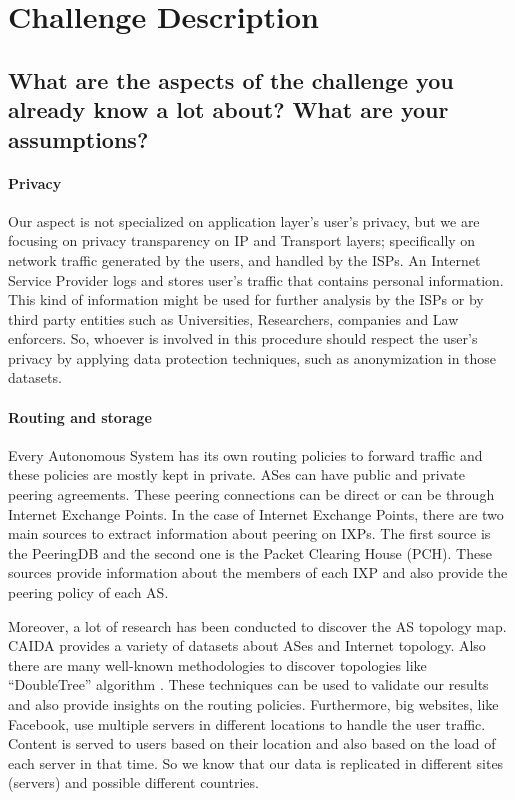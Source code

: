 \section{Challenge Description}
\label{sec_a}

\vspace{1cm}
\subsection{What are the aspects of the challenge you already know a lot about?
What are your assumptions?}
\vspace{0.7cm}

\paragraph{Privacy\\}

Our aspect is not specialized  on application layer's  user's privacy,  
but we are focusing on privacy transparency on IP and Transport layers; 
specifically on  network traffic generated by the users, and  handled by the ISPs.
An Internet Service Provider logs and stores user's traffic that contains 
personal information. 
This kind of information might be used for further analysis by the ISPs or by 
third party entities such as Universities, Researchers, companies and Law enforcers.	
So, whoever is involved in this procedure should respect the user's privacy by 
applying data protection techniques, such as anonymization in those datasets.

\paragraph{Routing and storage\\}

Every Autonomous System has its own routing policies to forward traffic and these 
policies are mostly kept in private. ASes can have public and private peering 
agreements. These peering connections can be direct or can be through Internet 
Exchange Points. In the case of Internet Exchange Points, there are two main 
sources to extract information about peering on IXPs. The first source is the 
PeeringDB and the second one is the Packet Clearing House (PCH). 
These sources provide information about the members of each IXP and also provide
the peering policy of each AS. 

Moreover, a lot of research has been conducted to discover the AS topology map. 
CAIDA provides a variety of datasets about ASes and Internet topology. Also there 
are many well-known methodologies to discover topologies like ``DoubleTree'' algorithm 
\cite{caida}. 
These techniques can be used  to validate our results and also provide insights 
on the routing policies.
Furthermore, big websites, like Facebook, use multiple servers in different locations 
to handle the user traffic. Content is served to users based on their location and 
also based on the load of each server in that time. So we know that our data is 
replicated in different sites (servers) and possible different countries. 


